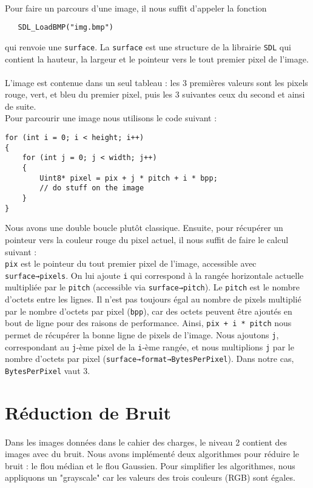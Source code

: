 \documentclass{article}
\begin{document}
\paragraph{}
Pour faire un parcours d’une image, il nous suffit d’appeler la fonction 
\begin{lstlisting}
   SDL_LoadBMP("img.bmp")
\end{lstlisting}
qui renvoie une \texttt{surface}. La \texttt{surface} est une structure de la librairie \texttt{SDL} qui contient la hauteur, la largeur et le pointeur vers le tout premier pixel de l’image.
\paragraph{}
L’image est contenue dans un seul tableau : les 3 premières valeurs sont les pixels rouge, vert, et bleu du premier pixel, puis les 3 suivantes ceux du second et ainsi de suite. \\
Pour parcourir une image nous utilisons le code suivant :
\begin{lstlisting}
for (int i = 0; i < height; i++) 
{
    for (int j = 0; j < width; j++) 
    {
        Uint8* pixel = pix + j * pitch + i * bpp;
        // do stuff on the image
    }
}
\end{lstlisting}
Nous avons une double boucle plutôt classique. Ensuite, pour récupérer un pointeur vers la couleur rouge du pixel actuel, il nous suffit de faire le calcul suivant :
\\
\texttt{pix} est le pointeur du tout premier pixel de l’image, accessible avec \texttt{surface→pixels}. On lui ajoute \texttt{i} qui correspond à la rangée horizontale actuelle multipliée par le \texttt{pitch} (accessible via \texttt{surface→pitch}). Le \texttt{pitch} est le nombre d'octets entre les lignes. Il n’est pas toujours égal au nombre de pixels multiplié par le nombre d'octets par pixel (\texttt{bpp}), car des octets peuvent être ajoutés en bout de ligne pour des raisons de performance. Ainsi, \texttt{pix + i * pitch} nous permet de récupérer la bonne ligne de pixels de l’image. Nous ajoutons \texttt{j}, correspondant au \texttt{j}-ème pixel de la \texttt{i}-ème rangée, et nous multiplions \texttt{j} par le nombre d'octets par pixel (\texttt{surface→format→BytesPerPixel}). Dans notre cas, \texttt{BytesPerPixel} vaut 3.

\section{Réduction de Bruit}
\paragraph{}
Dans les images données dans le cahier des charges, le niveau 2 contient des images avec du bruit. Nous avons implémenté deux algorithmes pour réduire le bruit : le flou médian et le flou Gaussien. Pour simplifier les algorithmes, nous appliquons un "grayscale" car les valeurs des trois couleurs (RGB) sont égales.
\end{document}
